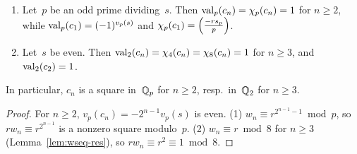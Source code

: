 \begin{lemma}[Primes of~$s$]
  \label{lem:pat-s}
  \leanok
  \begin{enumerate}
    \item Let~$p$ be an odd prime dividing~$s$. Then $\operatorname{val}_p(c_n) = \chi_p(c_n) = 1$ for $n \ge 2$,
          while $\operatorname{val}_p(c_1) = (-1)^{v_p(s)}$ and $\chi_p(c_1) = \left(\frac{-r s_p}{p}\right)$.
    \item Let~$s$ be even. Then $\operatorname{val}_2(c_n) = \chi_4(c_n) = \chi_8(c_n) = 1$ for $n \ge 3$, and
          $\operatorname{val}_2(c_2) = 1$.
  \end{enumerate}
  In particular, $c_n$ is a square in~$\mathbb{Q}_p$ for $n \ge 2$, resp.\ in~$\mathbb{Q}_2$ for $n \ge 3$.
\end{lemma}
\begin{proof}
  \leanok
  For $n \ge 2$, $v_p(c_n) = -2^{n-1} v_p(s)$ is even. (1) $w_n \equiv r^{2^{n-1}-1} \bmod p$, so
  $r w_n \equiv r^{2^{n-1}}$ is a nonzero square modulo~$p$. (2) $w_n \equiv r \bmod 8$ for
  $n \ge 3$ (Lemma~\ref{lem:wseq-res}), so $r w_n \equiv r^2 \equiv 1 \bmod 8$.
\end{proof}

